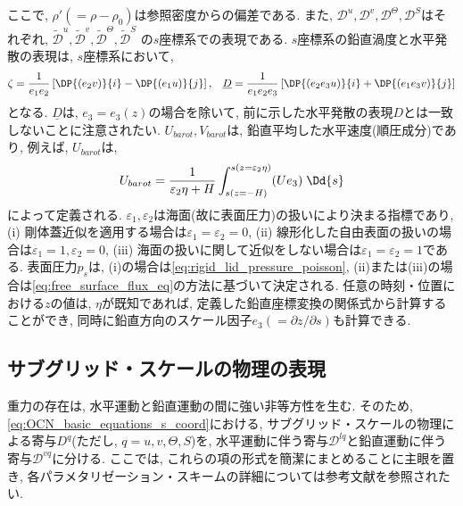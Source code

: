 ここで, $\rho'(=\rho - \rho_0)$は参照密度からの偏差である. 
また, $\mathcal{D}^u, \mathcal{D}^v, \mathcal{D}^\Theta, \mathcal{D}^S$はそれぞれ, 
$\mathcal{\tilde{D}}^u, \mathcal{\tilde{D}}^v, \mathcal{\tilde{D}}^\Theta, \mathcal{\tilde{D}}^S$
の$s$座標系での表現である. 
$s$座標系の鉛直渦度と水平発散の表現は, $s$座標系において, 
\begin{equation}
 \zeta = \dfrac{1}{e_1 e_2}\left[ \DP{(e_2 v)}{i} - \DP{(e_1 u)}{j} \right], \;\;\;
 \underline{D}  = \dfrac{1}{e_1 e_2 e_3}\left[ \DP{(e_2 e_3 u)}{i} + \DP{(e_1 e_3 v)}{j} \right]
\label{eq:relvor_hdiv_generalvcoord}
\end{equation}
%
となる. 
$\underline{D}$は, $e_3=e_3(z)$の場合を除いて, 前に示した水平発散の表現$D$とは一致しないことに注意されたい. 
$U_{barot}, V_{barot}$は, 鉛直平均した水平速度(順圧成分)であり, 
例えば, $U_{barot}$は, 
\begin{align*}
 U_{barot} = \dfrac{1}{\varepsilon_2 \eta + H}
  \int_{s(z=-H)}^{s(z=\varepsilon_2 \eta)} (U e_3) \; \Dd{s}
\end{align*}
によって定義される. 
$\varepsilon_1, \varepsilon_2$は海面(故に表面圧力)の扱いにより決まる指標であり, 
(i) 剛体蓋近似を適用する場合は$\varepsilon_1=\varepsilon_2=0$, 
(ii) 線形化した自由表面の扱いの場合は$\varepsilon_1=1, \varepsilon_2=0$,
(iii) 海面の扱いに関して近似をしない場合は$\varepsilon_1=\varepsilon_2=1$である. 
表面圧力$p_s$は,
(i)の場合は\eqref{eq:rigid_lid_pressure_poisson},
(ii)または(iii)の場合は\eqref{eq:free_surface_flux_eq}の方法に基づいて決定される. 
任意の時刻・位置における$z$の値は, $\eta$が既知であれば, 定義した鉛直座標変換の関係式から計算することができ,  
同時に鉛直方向のスケール因子$e_3(=\partial z/\partial s)$も計算できる. 

\subsection{サブグリッド・スケールの物理の表現}
重力の存在は, 水平運動と鉛直運動の間に強い非等方性を生む. 
そのため, \eqref{eq:OCN_basic_equations_s_coord}における, 
サブグリッド・スケールの物理による寄与$D^q$(ただし, $q=u,v,\Theta,S$)を, 
水平運動に伴う寄与$\mathcal{D}^{lq}$と鉛直運動に伴う寄与$\mathcal{D}^{vq}$に分ける. 
ここでは, これらの項の形式を簡潔にまとめることに主眼を置き,  
各パラメタリゼーション・スキームの詳細については参考文献を参照されたい.  

